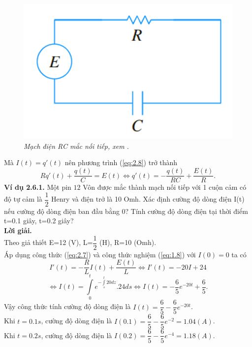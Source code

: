 \begin{figure}[H]
	\centering
	\includegraphics[scale=0.6]{Images/hinh_2_16.png}
	\caption[Mạch điện RC mắc nối tiếp, xem \cite{ref4}.
	]{\itshape\fontsize{13pt}{0pt}\selectfont\centering Mạch điện RC mắc nối tiếp, xem \cite{ref4}.}
	\label{hinh2.16}
\end{figure}
Mà $I(t)={q}'(t)$  nên phương trình (\ref{eq:2.8}) trở thành 
\begin{equation}
	Rq'(t)+\dfrac{q(t)}{C}=E(t)\Leftrightarrow q'(t)=-\dfrac{q(t)}{RC}+\dfrac{E(t)}{R}.  
	\label{eq:2.9}
\end{equation}                                
\textbf{Ví dụ 2.6.1.} Một pin $12$ Vôn được mắc thành mạch nối tiếp với 1 cuộn cảm có độ tự cảm là $\dfrac{1}{2}$ Henry và điện trở là 10 Omh. Xác định cường độ dòng điện I(t) nếu cường độ dòng điện ban đầu bằng 0? Tính cường độ dòng điện tại thời điểm t=0.1 giây, t=0.2 giây?\\
\textbf{Lời giải. }\\
Theo giả thiết E=12 (V), L=$\dfrac{1}{2}$ (H), R=10 (Omh).\\
Áp dụng công thức (\ref{eq:2.7}) và công thức nghiệm (\ref{eq:1.8}) với $I(0)=0$  ta có
$$ {I}'(t)=-\dfrac{R}{L}I(t)+\dfrac{E(t)}{L}\Leftrightarrow {I}'(t)=-20I+24 $$
$$\Leftrightarrow I(t)=\int\limits_{0}^{t}{{{e}^{-\int\limits_{s}^{t}{20dz}}}.24ds}\Leftrightarrow I(t)=-\dfrac{6}{5}{{e}^{-20t}}+\dfrac{6}{5}. $$
Vậy công thức tính cường độ dòng điện là $I(t)=\dfrac{6}{5} -\dfrac{6}{5}e^{-20t}$.\\
Khi $t=0.1s$, cường độ dòng điện là $I(0.1)=\dfrac{6}{5}-\dfrac{6}{5}e^{-2}=1.04 (A)$.\\
 Khi $t=0.2s$, cường độ dòng điện là   $I(0.2)=\dfrac{6}{5}-\dfrac{6}{5}e^{-4}=1.18 (A)$.  

